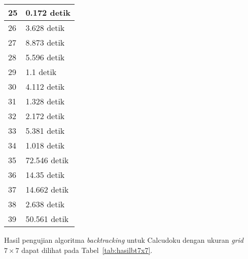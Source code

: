 \begin{table}
\begin{tabular}{| l | l |}
25 & 0.172 detik \\
\hline
26 & 3.628 detik \\
\hline
27 & 8.873 detik \\
\hline
28 & 5.596 detik \\
\hline
29 & 1.1 detik \\
\hline
30 & 4.112 detik \\
\hline
31 & 1.328 detik \\
\hline
32 & 2.172 detik \\
\hline
33 & 5.381 detik \\
\hline
34 & 1.018 detik \\
\hline
35 & 72.546 detik \\
\hline
36 & 14.35 detik \\
\hline
37 & 14.662 detik \\
\hline
38 & 2.638 detik \\
\hline
39 & 50.561 detik \\
\hline
\end{tabular}
\label{tab:hasilbt6x6}
\end{table}

Hasil pengujian algoritma \textit{backtracking} untuk Calcudoku dengan ukuran \textit{grid} \begin{math}7 \times 7\end{math} dapat dilihat pada Tabel~\ref{tab:hasilbt7x7}.

